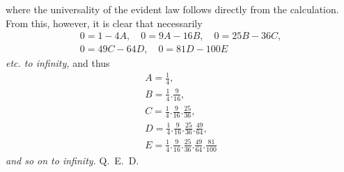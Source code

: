 where the universality of the evident law follows directly from the calculation. From this, however, it is clear
that necessarily
\[
\begin{gathered}0=1-4A,\quad 0=9A-16B,\quad 0=25B-36C,\\[6pt]
0=49C-64D,\quad 0=81D-100E\end{gathered}
\]
\textit{etc. to infinity,} and thus
\[
\begin{gathered}A=\tfrac14,\\ B=\tfrac14.\tfrac9{16},\\[6pt]
C=\tfrac14.\tfrac9{16}.\tfrac{25}{36},\\[6pt]
D=\tfrac14.\tfrac9{16}.\tfrac{25}{36}.\tfrac{49}{64},\\[6pt]
E=\tfrac14.\tfrac9{16}.\tfrac{25}{36}.\tfrac{49}{64}.\tfrac{81}{100}\end{gathered}
\]
\textit{and so on to infinity.} Q.~E.~D.
\clearpage
\endgroup
